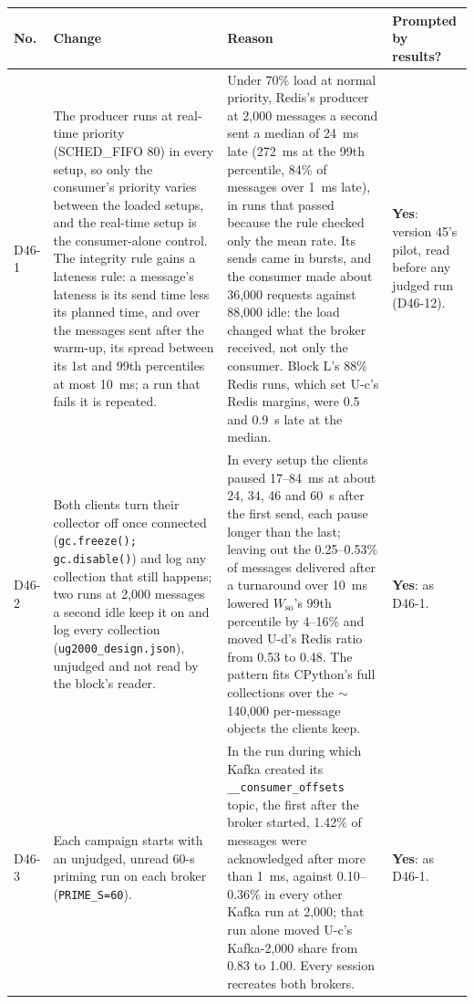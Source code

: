 \documentclass[11pt]{article}
\begin{document}
{\small
\begin{longtable}{@{}p{1.1cm} >{\raggedright\arraybackslash}p{6.1cm} >{\raggedright\arraybackslash}p{6.0cm} >{\raggedright\arraybackslash}p{2.2cm}@{}}
\toprule
\textbf{No.} & \textbf{Change} & \textbf{Reason} & \textbf{Prompted by results?} \\
\midrule
\endhead
D46-1 & The producer runs at real-time priority (SCHED\_FIFO 80) in every setup, so only the consumer's priority varies between the loaded setups, and the real-time setup is the consumer-alone control. The integrity rule gains a lateness rule: a message's lateness is its send time less its planned time, and over the messages sent after the warm-up, its spread between its 1st and 99th percentiles at most 10~ms; a run that fails it is repeated. & Under 70\% load at normal priority, Redis's producer at 2,000 messages a second sent a median of 24~ms late (272~ms at the 99th percentile, 84\% of messages over 1~ms late), in runs that passed because the rule checked only the mean rate. Its sends came in bursts, and the consumer made about 36,000 requests against 88,000 idle: the load changed what the broker received, not only the consumer. Block L's 88\% Redis runs, which set U-c's Redis margins, were 0.5 and 0.9~s late at the median. & \textbf{Yes}: version 45's pilot, read before any judged run (D46-12). \\
D46-2 & Both clients turn their collector off once connected (\texttt{gc.freeze(); gc.disable()}) and log any collection that still happens; two runs at 2,000 messages a second idle keep it on and log every collection (\texttt{ug2000\_design.json}), unjudged and not read by the block's reader. & In every setup the clients paused 17--84~ms at about 24, 34, 46 and 60~s after the first send, each pause longer than the last; leaving out the 0.25--0.53\% of messages delivered after a turnaround over 10~ms lowered $W_{\mathrm{so}}$'s 99th percentile by 4--16\% and moved U-d's Redis ratio from 0.53 to 0.48. The pattern fits CPython's full collections over the $\sim$140,000 per-message objects the clients keep. & \textbf{Yes}: as D46-1. \\
D46-3 & Each campaign starts with an unjudged, unread 60-s priming run on each broker (\texttt{PRIME\_S=60}). & In the run during which Kafka created its \texttt{\_\_consumer\_offsets} topic, the first after the broker started, 1.42\% of messages were acknowledged after more than 1~ms, against 0.10--0.36\% in every other Kafka run at 2,000; that run alone moved U-c's Kafka-2,000 share from 0.83 to 1.00. Every session recreates both brokers. & \textbf{Yes}: as D46-1. \\

\end{longtable}}
\end{document}
